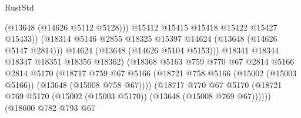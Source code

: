 \begin{lexlean}{RustStd}
\begin{coremodule}
                                              (@13648 (@14626 @5112 @5128)))
                                            @15412
                                            @15415
                                            @15418
                                            @15422
                                            @15427
                                            @15433))
                                        (@18314
                                          @5146
                                          @2855
                                          @18325
                                          @15397
                                          @14624
                                          (@13648 (@14626 @5147 @2814)))
                                        @14624
                                        (@13648 (@14626 @5104 @5153)))
                                      @18341
                                      @18344
                                      @18347
                                      @18351
                                      @18356
                                      @18362)
                                    (@18368
                                      @5163
                                      @759
                                      @770
                                      @67
                                      @2814
                                      @5166
                                      @2814
                                      @5170
                                      (@18717
                                        @759
                                        @67
                                        @5166
                                        (@18721
                                          @758
                                          @5166
                                          (@15002 (@15003 @5166))
                                          (@13648 (@15008 @758 @67))))
                                      (@18717
                                        @770
                                        @67
                                        @5170
                                        (@18721
                                          @769
                                          @5170
                                          (@15002 (@15003 @5170))
                                          (@13648 (@15008 @769 @67))))))
                                  (@18600
                                    @782
                                    @793
                                    @67

\end{coremodule}
\end{lexlean}
